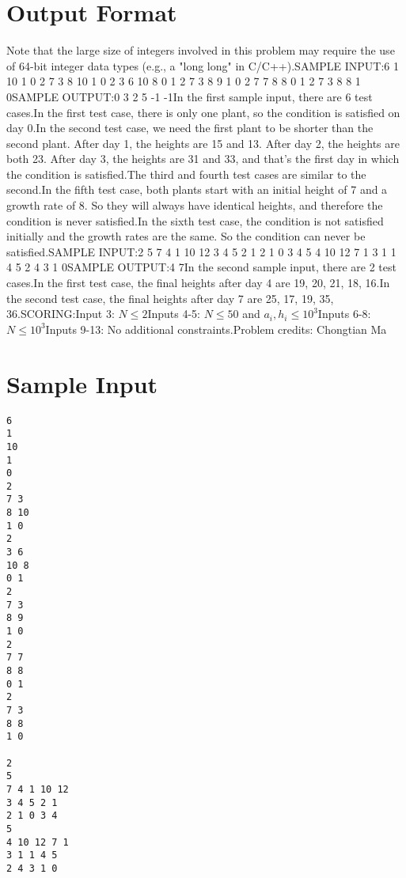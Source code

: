 \documentclass[12pt]{article}
\begin{document}
\section*{Output Format}
Note that the large size of integers involved in this problem may require the
use of 64-bit integer data types (e.g., a "long long" in C/C++).SAMPLE INPUT:6
1
10
1
0
2
7 3
8 10
1 0
2
3 6
10 8
0 1
2
7 3
8 9
1 0
2
7 7
8 8
0 1
2
7 3
8 8
1 0SAMPLE OUTPUT:0
3
2
5
-1
-1In the first sample input, there are 6 test cases.In the first test case, there is only one plant, so the condition is satisfied
on day 0.In the second test case, we need the first plant to be shorter than the second
plant.  After day 1, the heights are 15 and 13.  After day 2, the heights are
both 23.  After day 3, the heights are 31 and 33, and that's the first day in
which the condition is satisfied.The third and fourth test cases are similar to the second.In the fifth test case, both plants start with an initial height of 7 and a
growth rate of 8.  So they will always have identical heights, and therefore the
condition is never satisfied.In the sixth test case, the condition is not satisfied initially and the growth
rates are the same. So the condition can never be satisfied.SAMPLE INPUT:2
5
7 4 1 10 12
3 4 5 2 1
2 1 0 3 4
5
4 10 12 7 1
3 1 1 4 5
2 4 3 1 0SAMPLE OUTPUT:4
7In the second sample input, there are 2 test cases.In the first test case, the final heights after day 4 are 19, 20, 21, 18, 16.In the second test case, the final heights after day 7 are 25, 17, 19, 35, 36.SCORING:Input 3: $N \le 2$Inputs 4-5: $N \le 50$ and $a_i, h_i \le 10^3$Inputs 6-8: $N \le 10^3$Inputs 9-13: No additional constraints.Problem credits: Chongtian Ma

\section*{Sample Input}
\begin{verbatim}
6
1
10
1
0
2
7 3
8 10
1 0
2
3 6
10 8
0 1
2
7 3
8 9
1 0
2
7 7
8 8
0 1
2
7 3
8 8
1 0

2
5
7 4 1 10 12
3 4 5 2 1
2 1 0 3 4
5
4 10 12 7 1
3 1 1 4 5
2 4 3 1 0
\end{verbatim}
\end{document}

